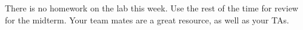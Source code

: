 \documentclass[11pt]{article}
\begin{document}
There is no homework on the lab this week. Use the rest of the time for review for the midterm. Your team mates are a great resource, as well as your TAs.



\theendnotes
\end{document}

